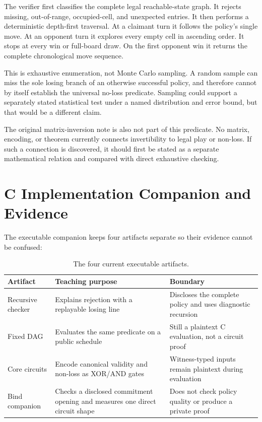 The verifier first classifies the complete legal reachable-state graph. It
rejects missing, out-of-range, occupied-cell, and unexpected entries. It then
performs a deterministic depth-first traversal. At a claimant turn it follows
the policy's single move. At an opponent turn it explores every empty cell in
ascending order. It stops at every win or full-board draw. On the first
opponent win it returns the complete chronological move sequence.

This is exhaustive enumeration, not Monte Carlo sampling. A random sample can
miss the sole losing branch of an otherwise successful policy, and therefore
cannot by itself establish the universal no-loss predicate. Sampling could
support a separately stated statistical test under a named distribution and
error bound, but that would be a different claim.

The original matrix-inversion note is also not part of this predicate. No
matrix, encoding, or theorem currently connects invertibility to legal play or
non-loss. If such a connection is discovered, it should first be stated as a
separate mathematical relation and compared with direct exhaustive checking.

\section{C Implementation Companion and Evidence}
\label{sec:ttt-implementation}

The executable companion keeps four artifacts separate so their evidence
cannot be confused:

\begin{table}[H]
\centering
\small
\begin{tabular}{@{}
>{\raggedright\arraybackslash}p{}
>{\raggedright\arraybackslash}p{}
>{\raggedright\arraybackslash}p{}@{}}
\hline
Artifact & Teaching purpose & Boundary \\
\hline
Recursive checker & Explains rejection with a replayable losing line & Discloses the complete policy and uses diagnostic recursion \\
Fixed DAG & Evaluates the same predicate on a public schedule & Still a plaintext C evaluation, not a circuit proof \\
Core circuits & Encode canonical validity and non-loss as XOR/AND gates & Witness-typed inputs remain plaintext during evaluation \\
Bind companion & Checks a disclosed commitment opening and measures one direct circuit shape & Does not check policy quality or produce a private proof \\
\hline
\end{tabular}
\caption{The four current executable artifacts.}
\label{tab:ttt-implementation-artifacts}
\end{table}

